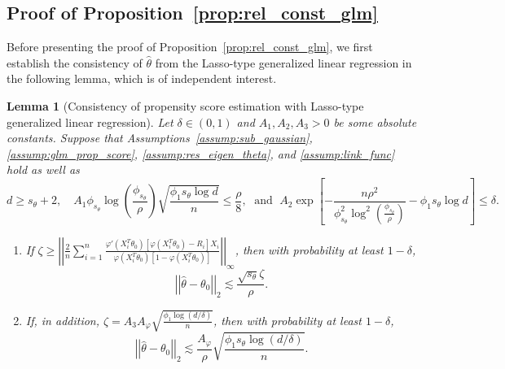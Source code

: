 \documentclass[ejsv2,noshowframe]{imsart}
\theoremstyle{plain}
\newtheorem{lemma}[theorem]{Lemma}
\theoremstyle{definition}
\theoremstyle{remark}
\newcommand{\norm}[1]{\left|\left| #1 \right|\right|}
\renewcommand{\hat}{\widehat}
\begin{document}
\subsection{Proof of Proposition~\ref{prop:rel_const_glm}}
\label{subapp:proof_prop_score}

Before presenting the proof of Proposition~\ref{prop:rel_const_glm}, we first establish the consistency of $\hat{\theta}$ from the Lasso-type generalized linear regression in the following lemma, which is of independent interest. 

\begin{lemma}[Consistency of propensity score estimation with Lasso-type generalized linear regression]
	\label{lem:prop_score_const}
	Let $\delta \in (0,1)$ and $A_1,A_2,A_3 >0$ be some absolute constants. Suppose that Assumptions~\ref{assump:sub_gaussian}, \ref{assump:glm_prop_score}, \ref{assump:res_eigen_theta}, and \ref{assump:link_func} hold as well as
	$$d \geq s_{\theta} + 2, \quad A_1\phi_{s_{\theta}} \log\left(\frac{\phi_{s_{\theta}}}{\rho}\right) \sqrt{\frac{\phi_1 s_{\theta}\log d}{n}} \leq \frac{\rho}{8}, \; \text{ and }\;   A_2\exp\left[-\frac{n\rho^2}{\phi_{s_{\theta}}^2 \log^2\left(\frac{\phi_{s_{\theta}}}{\rho}\right)} - \phi_1 s_{\theta}\log d\right] \leq \delta.$$
	\begin{enumerate}[label=(\alph*)]
		\item If $\zeta \geq \norm{\frac{2}{n}\sum\limits_{i=1}^n \frac{\varphi'(X_i^T\theta_0)\left[\varphi(X_i^T\theta_0) -R_i \right]X_i}{\varphi(X_i^T\theta_0) \left[1-\varphi(X_i^T\theta_0) \right]}}_{\infty}$, then with probability at least $1-\delta$,
		$$\norm{\hat{\theta} - \theta_0}_2 \lesssim \frac{\sqrt{s_{\theta}} \zeta}{\rho}.$$ 
		
		\item If, in addition, $\zeta = A_3 A_{\varphi} \sqrt{\frac{\phi_1\log(d/\delta)}{n}}$, then with probability at least $1-\delta$,
		$$\norm{\hat{\theta} - \theta_0}_2 \lesssim \frac{A_{\varphi}}{\rho} \sqrt{\frac{\phi_1 s_{\theta} \log(d/\delta)}{n}}.$$
	\end{enumerate}
\end{lemma}
\end{document}
